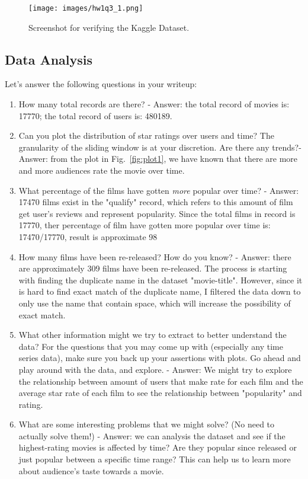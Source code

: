 \documentclass[paper=a4, fontsize=11pt]{scrartcl} %
\begin{document}
\begin{figure}
    \centering
    \texttt{[image: images/hw1q3\_1.png]}
    \caption{Screenshot for verifying the Kaggle Dataset.}
    \label{fig:my_label}
\end{figure}



\subsection{Data Analysis}
\label{sec:data-analysis}

Let's answer the following questions in your writeup: 

\begin{enumerate}
    \item How many total records are there? - Answer: the total record of movies is: 17770; the total record of users is: 480189.
    \item Can you plot the distribution of star ratings over users and time? The granularity of the sliding window is at your discretion. Are there any trends?- Answer: from the plot in Fig.~\ref{fig:plot1}, we have known that there are more and more audiences rate the movie over time.
    \item What percentage of the films have gotten \emph{more} popular over time? - Answer: 17470 films exist in the "qualify" record, which refers to this amount of film get user's reviews and represent popularity. Since the total films in record is 17770, ther percentage of film have gotten more popular over time is: 17470/17770, result is approximate 98%
    \item How many films have been re-released? How do you know? - Answer: there are approximately 309 films have been re-released. The process is starting with finding the duplicate name in the dataset "movie-title". However, since it is hard to find exact match of the duplicate name, I filtered the data down to only use the name that contain space, which will increase the possibility of exact match.
    \item What other information might we try to extract to better understand the data? For the questions that you may come up with (especially any time series data), make sure you back up your assertions with plots. Go ahead and play around with the data, and explore. - Answer: We might try to explore the relationship between amount of users that make rate for each film and the average star rate of each film to see the relationship between "popularity" and rating. 
    \item What are some interesting problems that we might solve? (No need to actually solve them!) - Answer: we can analysis the dataset and see if the highest-rating movies is affected by time? Are they popular since released or just popular between a specific time range? This can help us to learn more about audience's taste towards a movie.
\end{enumerate}
\end{document}
